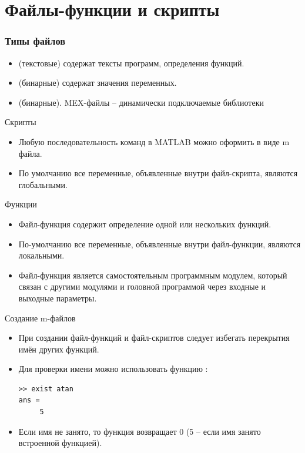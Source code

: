 \documentclass[11pt, compress]{beamer}
\begin{document}

\section{Файлы-функции и скрипты}

\frame
{
  \frametitle{Типы файлов}  
  \begin{itemize}
    \item {} (текстовые) содержат тексты программ, определения функций.
    \item {} (бинарные) содержат значения переменных.
    \item {} (бинарные). MEX-файлы -- динамически подключаемые библиотеки
  \end{itemize}
}

\begin{frame}[fragile]{Скрипты}      
    \begin{itemize}
      \item Любую последовательность команд в MATLAB можно оформить в виде m файла.
      \item По умолчанию все переменные, объявленные внутри файл-скрипта, являются глобальными.
    \end{itemize}
\end{frame}

\begin{frame}[fragile]{Функции}    
      \begin{itemize}
	\item Файл-функция содержит определение одной или нескольких функций. 
	\item По-умолчанию все переменные, объявленные внутри файл-функции, являются локальными. 
	\item Файл-функция является самостоятельным программным модулем, который связан с другими модулями и головной программой через входные и выходные параметры.
      \end{itemize}  
\end{frame}

\begin{frame}[fragile]{Создание m-файлов}
\begin{itemize}
\item При создании файл-функций и файл-скриптов следует избегать перекрытия имён других функций.
\item Для проверки имени можно использовать функцию :
\begin{lstlisting}
>> exist atan
ans =
     5 
\end{lstlisting}
\item Если имя не занято, то функция  возвращает 0 (5 -- если имя занято встроенной функцией). 
\end{itemize}
\end{frame}
%
%
\end{document}
